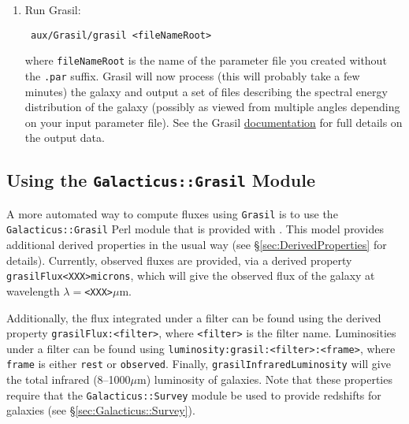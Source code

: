 \begin{enumerate}
 \item Run {\sc Grasil}:
\begin{verbatim}
 aux/Grasil/grasil <fileNameRoot>
\end{verbatim}
where {\tt fileNameRoot} is the name of the parameter file you created without the {\tt .par} suffix. {\sc Grasil} will now process (this will probably take a few minutes) the galaxy and output a set of files describing the spectral energy distribution of the galaxy (possibly as viewed from multiple angles depending on your input parameter file). See the {\sc Grasil} \href{http://adlibitum.oat.ts.astro.it/silva/grasil/grasil.doc}{documentation} for full details on the output data.
\end{enumerate}

\subsection{Using the {\tt Galacticus::Grasil} Module}

A more automated way to compute fluxes using {\tt Grasil} is to use the {\tt Galacticus::Grasil} Perl module that is provided with \glc. This model provides additional derived properties in the usual way (see \S\ref{sec:DerivedProperties} for details). Currently, observed fluxes are provided, via a derived property {\tt grasilFlux\textless XXX\textgreater microns}, which will give the observed flux of the galaxy at wavelength $\lambda=${\tt\textless XXX\textgreater}$\mu$m.

Additionally, the flux integrated under a filter can be found using the derived property {\tt grasilFlux:\textless filter\textgreater}, where {\tt \textless filter\textgreater} is the filter name. Luminosities under a filter can be found using {\tt luminosity:grasil:\textless filter\textgreater:\textless frame\textgreater}, where {\tt frame} is either {\tt rest} or {\tt observed}. Finally, {\tt grasilInfraredLuminosity} will give the total infrared (8--1000$\mu$m) luminosity of galaxies. Note that these properties require that the {\tt Galacticus::Survey} module be used to provide redshifts for galaxies (see \S\ref{sec:Galacticus::Survey}).

